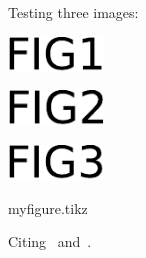 \documentclass[leqno]{amsart}
\begin{document}
Testing three images:

\begin{center}
  \includegraphics[width=1in]{fig1.pdf}
\end{center}

\begin{center}
  \includegraphics[width=1in]{fig2}
\end{center}

\begin{center}
  \includegraphics[width=1in]{./figs3/fig3}
\end{center}

{myfigure.tikz}



Citing~\cite{entry1} and~\cite{entry2}.



\end{document}
